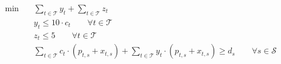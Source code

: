 \begin{align}
  \min\quad & \sum_{t \in \mathcal{T}} y_{t} + \sum_{t \in \mathcal{T}} z_{t} \tag{total\_adjustments} \\
  & y_{t} \le 10 \cdot c_{t} \qquad \forall t \in \mathcal{T} \tag{capacity\_limit} \\
  & z_{t} \le 5 \qquad \forall t \in \mathcal{T} \tag{frequency\_limit} \\
  & \sum_{t \in \mathcal{T}} c_{t} \cdot (p_{t,s} + x_{t,s}) + \sum_{t \in \mathcal{T}} y_{t} \cdot (p_{t,s} + x_{t,s}) \ge d_{s} \qquad \forall s \in \mathcal{S} \tag{demand\_coverage} \\
\end{align}